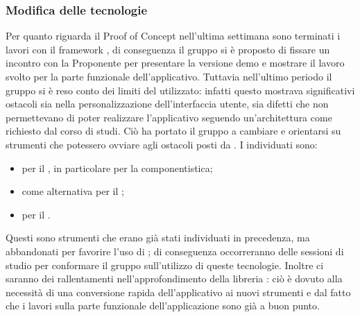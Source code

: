 \subsubsection{Modifica delle tecnologie}
\par Per quanto riguarda il Proof of Concept nell'ultima settimana sono terminati i lavori con il framework , di conseguenza il gruppo si è proposto di fissare un incontro con la Proponente per presentare la versione demo e mostrare il lavoro svolto per la parte funzionale dell'applicativo.
Tuttavia nell'ultimo periodo il gruppo si è reso conto dei limiti del  utilizzato: infatti questo mostrava significativi ostacoli sia nella personalizzazione dell'interfaccia utente, sia difetti che non permettevano di poter realizzare l'applicativo seguendo un'architettura come richiesto dal corso di studi.
Ciò ha portato il gruppo a cambiare  e orientarsi su strumenti che potessero ovviare agli ostacoli posti da .
I  individuati sono:
\begin{itemize}
	\item {} per il , in particolare per la componentistica;
	\item {} come alternativa per il ;
	\item {} per il .
\end{itemize}
Questi sono strumenti che erano già stati individuati in precedenza, ma abbandonati per favorire l'uso di ; di conseguenza occorreranno delle sessioni di studio per conformare il gruppo sull'utilizzo di queste tecnologie.
Inoltre ci saranno dei rallentamenti nell'approfondimento della libreria : ciò è dovuto alla necessità di una conversione rapida dell'applicativo ai nuovi strumenti e dal fatto che i lavori sulla parte funzionale dell'applicazione sono già a buon punto.

